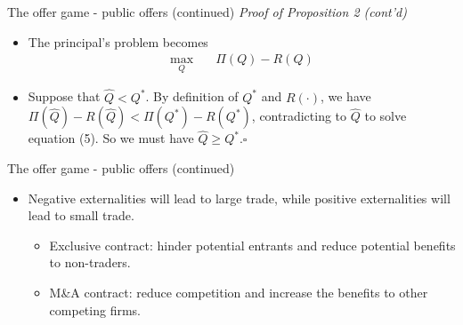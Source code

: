 \documentclass[aspectratio=169]{beamer}  %
\begin{document}
\begin{frame}{The offer game - public offers (continued)}
    \textit{Proof of Proposition 2 (cont'd)} \vspace{.2cm}
    \begin{itemize}
        \item The principal's problem becomes \vspace{.2cm}
        \begin{align*}
            \max_{Q} & \quad \Pi(Q) - R(Q)
        \end{align*}
        \item Suppose that $\hat{Q}<Q^*$. By definition of $Q^*$ and $R(\cdot)$, we have $\Pi(\hat{Q}) - R(\hat{Q}) < \Pi(Q^*) - R(Q^*)$, contradicting to $\hat{Q}$ to solve equation (5). So we must have $\hat{Q}\geq Q^*$.\hfill$\square$ \vspace{.2cm}
    \end{itemize}
\end{frame}



\begin{frame}{The offer game - public offers (continued)}
    \begin{itemize}
        \item Negative externalities will lead to large trade, while positive externalities will lead to small trade. \vspace{.2cm}
        \begin{itemize}
            \item Exclusive contract: hinder potential entrants and reduce potential benefits to non-traders. \vspace{.2cm}
            \item M\&A contract: reduce competition and increase the benefits to other competing firms. \vspace{.2cm}           
        \end{itemize}
    \end{itemize}

\end{frame}
\end{document}

